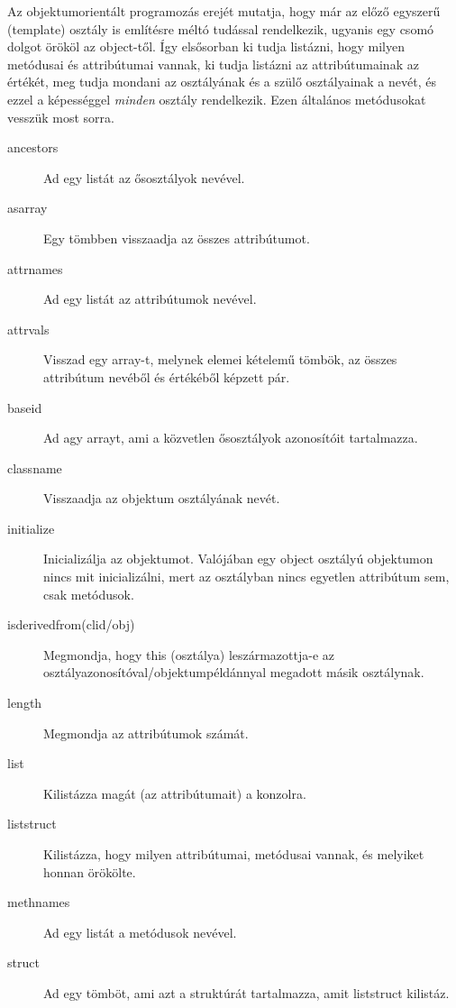 Az objektumorientált programozás erejét mutatja, 
hogy már  az előző egyszerű (template) osztály
is említésre méltó tudással rendelkezik, ugyanis egy csomó dolgot
örököl az object-től. Így elsősorban ki tudja listázni,
hogy milyen metódusai és attribútumai vannak, ki tudja listázni
az attribútumainak az értékét, meg tudja mondani az osztályának
és a szülő osztályainak a nevét, és ezzel a képességgel
{\em minden\/} osztály rendelkezik.  
Ezen általános metódusokat vesszük most sorra.
\begin{description}
\item[ancestors]
  Ad egy listát az ősosztályok nevével.

\item[asarray]
  Egy tömbben visszaadja az összes attribútumot.

\item[attrnames]
  Ad egy listát az attribútumok nevével.

\item[attrvals] 
  Visszad egy array-t, melynek elemei kételemű tömbök,
  az összes attribútum nevéből és értékéből képzett pár.

\item[baseid]
  Ad agy arrayt, ami a közvetlen ősosztályok azonosítóit tartalmazza.

\item[classname] 
  Visszaadja az objektum osztályának nevét.

\item[initialize]
  Inicializálja az objektumot.
  Valójában egy object osztályú objektumon nincs mit inicializálni,
  mert az osztályban nincs egyetlen attribútum sem, csak metódusok.

\item[isderivedfrom(clid/obj)]
  Megmondja, hogy this (osztálya) leszármazottja-e az
  osztályazonosítóval/objektumpéldánnyal megadott másik osztálynak.

\item[length]
  Megmondja az attribútumok számát.

\item[list]
  Kilistázza magát (az attribútumait) a konzolra. 

\item[liststruct]
  Kilistázza, hogy milyen attribútumai, metódusai vannak,
  és melyiket honnan örökölte.

\item[methnames]
  Ad egy listát a metódusok nevével.

\item[struct]
  Ad egy tömböt, ami azt a struktúrát tartalmazza, amit liststruct
  kilistáz.
\end{description}

